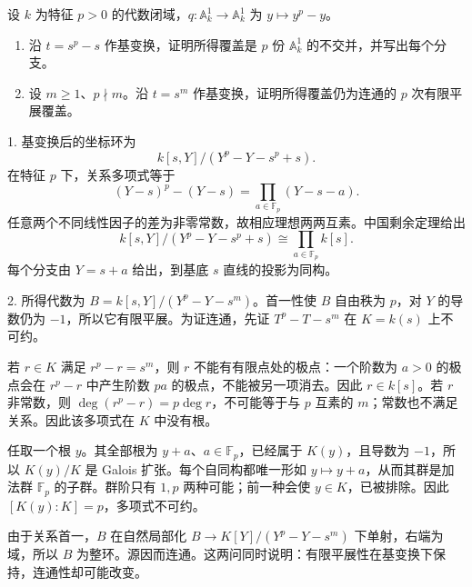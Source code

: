 \begin{exercise}\label{b3:ex:I-artin-schreier-pullbacks}
	设 \(k\) 为特征 \(p>0\) 的代数闭域，\(q:\mathbb A_k^1\rightarrow\mathbb A_k^1\) 为 \(y\mapsto y^p-y\)。
	\begin{enumerate}
		\item 沿 \(t=s^p-s\) 作基变换，证明所得覆盖是 \(p\) 份 \(\mathbb A_k^1\) 的不交并，并写出每个分支。
		\item 设 \(m\ge1\)、\(p\nmid m\)。沿 \(t=s^m\) 作基变换，证明所得覆盖仍为连通的 \(p\) 次有限平展覆盖。
	\end{enumerate}
\end{exercise}
\begin{solution}
	1. 基变换后的坐标环为
	\[
		k[s,Y]/(Y^p-Y-s^p+s).
	\]
	在特征 \(p\) 下，关系多项式等于
	\[
		(Y-s)^p-(Y-s)
		=\prod_{a\in\mathbb F_p}(Y-s-a).
	\]
	任意两个不同线性因子的差为非零常数，故相应理想两两互素。中国剩余定理给出
	\[
		k[s,Y]/(Y^p-Y-s^p+s)\cong\prod_{a\in\mathbb F_p}k[s].
	\]
	每个分支由 \(Y=s+a\) 给出，到基底 \(s\) 直线的投影为同构。

	2. 所得代数为 \(B=k[s,Y]/(Y^p-Y-s^m)\)。首一性使 \(B\) 自由秩为 \(p\)，对 \(Y\) 的导数仍为 \(-1\)，所以它有限平展。为证连通，先证 \(T^p-T-s^m\) 在 \(K=k(s)\) 上不可约。

	若 \(r\in K\) 满足 \(r^p-r=s^m\)，则 \(r\) 不能有有限点处的极点：一个阶数为 \(a>0\) 的极点会在 \(r^p-r\) 中产生阶数 \(pa\) 的极点，不能被另一项消去。因此 \(r\in k[s]\)。若 \(r\) 非常数，则 \(\deg(r^p-r)=p\deg r\)，不可能等于与 \(p\) 互素的 \(m\)；常数也不满足关系。因此该多项式在 \(K\) 中没有根。

	任取一个根 \(y\)。其全部根为 \(y+a\)、\(a\in\mathbb F_p\)，已经属于 \(K(y)\)，且导数为 \(-1\)，所以 \(K(y)/K\) 是 Galois 扩张。每个自同构都唯一形如 \(y\mapsto y+a\)，从而其群是加法群 \(\mathbb F_p\) 的子群。群阶只有 \(1,p\) 两种可能；前一种会使 \(y\in K\)，已被排除。因此 \([K(y):K]=p\)，多项式不可约。

	由于关系首一，\(B\) 在自然局部化 \(B\rightarrow K[Y]/(Y^p-Y-s^m)\) 下单射，右端为域，所以 \(B\) 为整环。源因而连通。这两问同时说明：有限平展性在基变换下保持，连通性却可能改变。
\end{solution}

